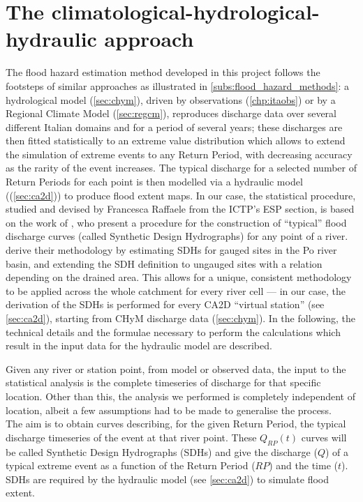 \section{The climatological-hydrological-hydraulic approach} \label{sec:3_mod_apprach}
The flood hazard estimation method developed in this project follows the footsteps of similar approaches as illustrated in \cref{subs:flood_hazard_methods}: a hydrological model (\cref{sec:chym}), driven by observations (\cref{chp:itaobs}) or by a Regional Climate Model (\cref{sec:regcm}), reproduces discharge data over several different Italian domains and for a period of several years; these discharges are then fitted statistically to an extreme value distribution which allows to extend the simulation of extreme events to any Return Period, with decreasing accuracy as the rarity of the event increases.
The typical discharge for a selected number of Return Periods for each point is then modelled via a hydraulic model ((\cref{sec:ca2d})) to produce flood extent maps.
In our case, the statistical procedure, studied and devised by Francesca Raffaele from the ICTP's ESP section, is based on the work of \citet{Maione2003}, who present a procedure for the construction of ``typical'' flood discharge curves (called Synthetic Design Hydrographs) for any point of a river.
\citet{Maione2003} derive their methodology by estimating SDHs for gauged sites in the Po river basin, and extending the SDH definition to ungauged sites with a relation depending on the drained area.
This allows for a unique, consistent methodology to be applied across the whole catchment for every river cell --- in our case, the derivation of the SDHs is performed for every CA2D ``virtual station'' (see \cref{sec:ca2d}), starting from CHyM discharge data (\cref{sec:chym}).
In the following, the technical details and the formulae necessary to perform the calculations which result in the input data for the hydraulic model are described.

Given any river or station point, from model or observed data, the input to the statistical analysis is the complete timeseries of discharge for that specific location. Other than this, the analysis we performed is completely independent of location, albeit a few assumptions had to be made to generalise the process.\\
The aim is to obtain curves describing, for the given Return Period, the typical discharge timeseries of the event at that river point. These $Q_{RP}(t)$ curves will be called Synthetic Design Hydrographs (SDHs) and give the discharge ($Q$) of a typical extreme event as a function of the Return Period ($RP$) and the time ($t$).
SDHs are required by the hydraulic model (see \cref{sec:ca2d}) to simulate flood extent.

